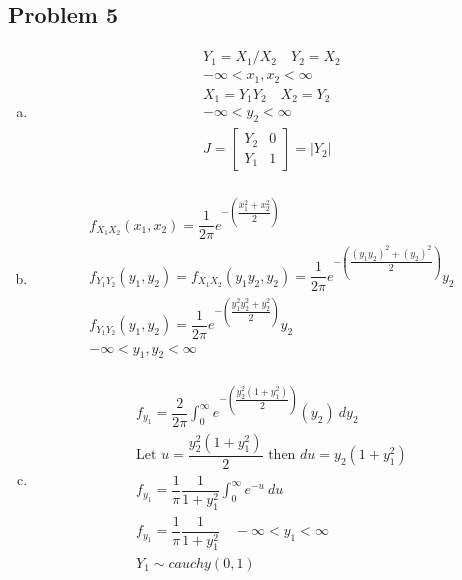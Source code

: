 \documentclass{article}
\begin{document}
\begin{flushleft}
\section*{Problem 5}
\begin{enumerate}[(a)]
\item 
\begin{multline*}
Y_1=X_1/X_2 \quad Y_2=X_2\\
-\infty <x_1,x_2<\infty\\
X_1=Y_1Y_2 \quad X_2=Y_2\\
-\infty<y_2<\infty\\
J=\begin{bmatrix}
Y_2 & 0\\
Y_1 & 1
\end{bmatrix}=|Y_2|\\
\end{multline*}
\item
\begin{multline*}
f_{X_1X_2}(x_1,x_2)=\dfrac{1}{2\pi}e^{-\left(\dfrac{x_1^2+x_2^2}{2}\right)}\\
f_{Y_1Y_2}(y_1,y_2)=f_{X_1X_2}(y_1y_2,y_2)=\dfrac{1}{2\pi}e^{-\left(\dfrac{(y_1y_2)^2+(y_2)^2}{2}\right)}y_2\\
f_{Y_1Y_2}(y_1,y_2)=\dfrac{1}{2\pi}e^{-\left(\dfrac{y_1^2y_2^2+y_2^2}{2}\right)}y_2\\
-\infty<y_1,y_2<\infty\\
\end{multline*}
\item 
\begin{multline*}
f_{y_1}=\dfrac{2}{2\pi}\int_{0}^{\infty}e^{-\left(\dfrac{y_2^2(1+y_1^2)}{2}\right)}(y_2) \ dy_2\\
\text{Let } u=\dfrac{y_2^2(1+y_1^2)}{2} \text{ then } du= y_2(1+y_1^2)\\
f_{y_1}=\dfrac{1}{\pi}\dfrac{1}{1+y_1^2}\int_{0}^{\infty}e^{-u} \ du\\
f_{y_1}=\dfrac{1}{\pi}\dfrac{1}{1+y_1^2} \quad -\infty<y_1<\infty\\
Y_1\sim cauchy(0,1)\\
\end{multline*}
\end{enumerate}
\end{flushleft}
\end{document}
